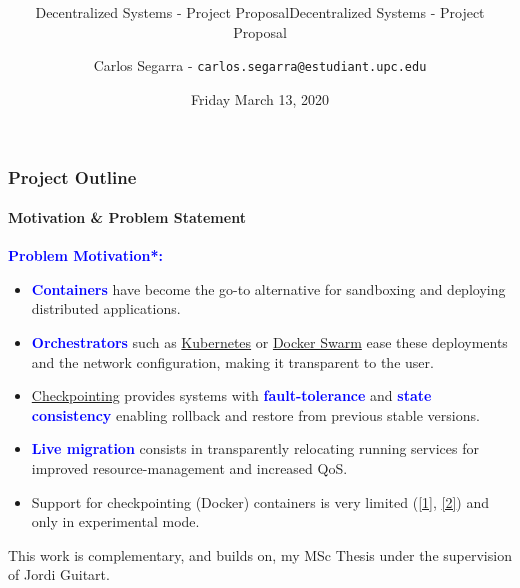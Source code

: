 \documentclass[9pt,    %
    english,            %
    xcolor=table,       %
    envcountsect,        %
    aspectratio=169     %
]{beamer}
\subtitle{Decentralized Systems - Project Proposal} %
\title[\mainTitle] %
    {\Large \mainTitle \\ \normalsize \secondTitle}
\subtitle{Decentralized Systems - Project Proposal} %
\date[March 13, 2020] %
    {Friday March 13, 2020}
\author[] %
{Carlos Segarra - \texttt{carlos.segarra@estudiant.upc.edu}}
\begin{document}
\begin{frame}
  \titlepage
\end{frame}

\begin{frame}
    \frametitle{Project Outline}
    \framesubtitle{Motivation \& Problem Statement}


    \textbf{\textcolor{blue}{Problem Motivation*:}}
    \begin{itemize}
        \item \textbf{\textcolor{blue}{Containers}} have become the go-to alternative for sandboxing and deploying distributed applications. 
        \item \textbf{\textcolor{blue}{Orchestrators}} such as \href{https://kubernetes.io/}{Kubernetes} or \href{https://docs.docker.com/engine/swarm/}{Docker Swarm} ease these deployments and the network configuration, making it transparent to the user.
        \item \href{https://en.wikipedia.org/wiki/Application_checkpointing}{Checkpointing} provides systems with \textbf{\textcolor{blue}{fault-tolerance}} and \textbf{\textcolor{blue}{state consistency}} enabling rollback and restore from previous stable versions.
        \item \textbf{\textcolor{blue}{Live migration}} consists in transparently relocating running services for improved resource-management and increased QoS.
        \item Support for checkpointing (Docker) containers is very limited (\href{https://github.com/docker/cli/blob/master/experimental/checkpoint-restore.md}{[1]}, \href{https://criu.org/Docker}{[2]}) and only in experimental mode. 
    \end{itemize}

    \vspace{10pt}
    \small
    \begin{description}
        \item *This work is complementary, and builds on, my MSc Thesis under the supervision of Jordi Guitart.
    \end{description}
\end{frame}
\end{document}

